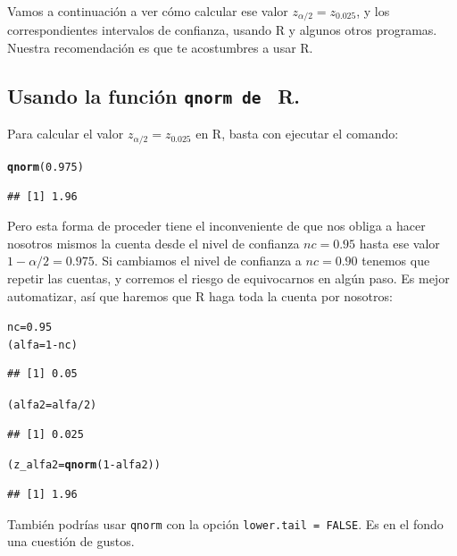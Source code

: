 \documentclass[10pt,a4paper]{article}\usepackage[]{graphicx}\usepackage[]{color}
\makeatletter
\newcommand{\hlnum}[1]{\textcolor[rgb]{0.686,0.059,0.569}{#1}}%
\newcommand{\hlopt}[1]{\textcolor[rgb]{0,0,0}{#1}}%
\newcommand{\hlstd}[1]{\textcolor[rgb]{0.345,0.345,0.345}{#1}}%
\newcommand{\hlkwb}[1]{\textcolor[rgb]{0.69,0.353,0.396}{#1}}%
\newcommand{\hlkwd}[1]{\textcolor[rgb]{0.737,0.353,0.396}{\textbf{#1}}}%
\newenvironment{kframe}{%
 \def\at@end@of@kframe{}%
 \ifinner\ifhmode%
  \def\at@end@of@kframe{\end{minipage}}%
  \begin{minipage}{\columnwidth}%
 \fi\fi%
 \def\FrameCommand##1{\hskip\@totalleftmargin \hskip-\fboxsep
 \colorbox{shadecolor}{##1}\hskip-\fboxsep
     \hskip-\linewidth \hskip-\@totalleftmargin \hskip\columnwidth}%
 \MakeFramed {\advance\hsize-\width
   \@totalleftmargin\z@ \linewidth\hsize
   \@setminipage}}%
 {\par\unskip\endMakeFramed%
 \at@end@of@kframe}
\newenvironment{knitrout}{}{} %
\newcounter {cont01}
\makeatother
\begin{document}
Vamos a continuación a ver cómo calcular ese valor $z_{\alpha/2}=z_{0.025}$, y los correspondientes intervalos de confianza, usando R y algunos otros programas. Nuestra recomendación es que te acostumbres a usar R.

\subsection{Usando la función {\tt qnorm de } R.}
\label{tut06:subsec:IntConfMediaZConQnorm}

Para calcular el valor $z_{\alpha/2}=z_{0.025}$ en R, basta con ejecutar el comando:
\begin{knitrout}
\color{fgcolor}\begin{kframe}
\begin{alltt}
    \hlkwd{qnorm}\hlstd{(}\hlnum{0.975}\hlstd{)}
\end{alltt}
\begin{verbatim}
## [1] 1.96
\end{verbatim}
\end{kframe}
\end{knitrout}
Pero esta forma de proceder tiene el inconveniente de que nos obliga a hacer nosotros mismos la cuenta desde el nivel de confianza $nc=0.95$ hasta ese valor $1-\alpha/2=0.975$. Si cambiamos el nivel de confianza a $nc=0.90$ tenemos que repetir las cuentas, y corremos el riesgo de equivocarnos en algún paso. Es mejor automatizar, así que haremos que R haga toda la cuenta por nosotros:
\begin{knitrout}
\color{fgcolor}\begin{kframe}
\begin{alltt}
    \hlstd{nc}\hlkwb{=}\hlnum{0.95}
    \hlstd{(alfa}\hlkwb{=}\hlnum{1}\hlopt{-}\hlstd{nc)}
\end{alltt}
\begin{verbatim}
## [1] 0.05
\end{verbatim}
\begin{alltt}
    \hlstd{(alfa2}\hlkwb{=}\hlstd{alfa}\hlopt{/}\hlnum{2}\hlstd{)}
\end{alltt}
\begin{verbatim}
## [1] 0.025
\end{verbatim}
\begin{alltt}
    \hlstd{(z_alfa2}\hlkwb{=}\hlkwd{qnorm}\hlstd{(}\hlnum{1}\hlopt{-}\hlstd{alfa2) )}
\end{alltt}
\begin{verbatim}
## [1] 1.96
\end{verbatim}
\end{kframe}
\end{knitrout}
También podrías usar {\tt qnorm} con la opción {\tt lower.tail = FALSE}. Es en el fondo una cuestión de gustos.
\end{document}

